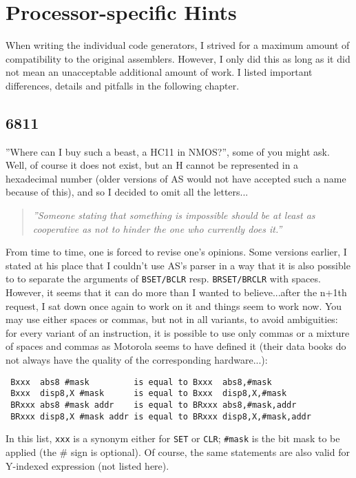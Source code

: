 \documentclass[12pt,twoside]{report}
\newcommand{\tty}[1]{{\tt #1}}
\newcommand{\asname}{{AS}}
\begin{document}

\cleardoublepage
\chapter{Processor-specific Hints}

When writing the individual code generators, I strived for a maximum
amount of compatibility to the original assemblers.  However, I only did this
as long as it did not mean an unacceptable additional amount of work.
I listed important differences, details and pitfalls in the following
chapter.


\section{6811}

''Where can I buy such a beast, a HC11 in NMOS?'', some of you might
ask.  Well, of course it does not exist, but an H cannot be
represented in a hexadecimal number (older versions of \asname{} would not
have accepted such a name because of this), and so I decided to omit
all the letters...
\par
\begin{quote}{\it
''Someone stating that something is impossible should be at least as
 cooperative as not to hinder the one who currently does it.''
}\end{quote}
From time to time, one is forced to revise one's opinions.  Some versions
earlier, I stated at his place that I couldn't use \asname{}'s parser in a way
that it is also possible to to separate the arguments of \tty{BSET/BCLR}
resp. \tty{BRSET/BRCLR} with spaces.  However, it seems that it can do
more than I wanted to believe...after the n+1th request, I sat down once
again to work on it and things seem to work now.  You may use either
spaces or commas, but not in all variants, to avoid ambiguities: for
every variant of an instruction, it is possible to use only commas or a
mixture of spaces and commas as Motorola seems to have defined it (their
data books do not always have the quality of the corresponding
hardware...):
\begin{verbatim}
 Bxxx  abs8 #mask         is equal to Bxxx  abs8,#mask
 Bxxx  disp8,X #mask      is equal to Bxxx  disp8,X,#mask
 BRxxx abs8 #mask addr    is equal to BRxxx abs8,#mask,addr
 BRxxx disp8,X #mask addr is equal to BRxxx disp8,X,#mask,addr
\end{verbatim}
In this list, \tty{xxx} is a synonym either for \tty{SET} or \tty{CLR};
\tty{\#mask} is the bit mask to be applied (the \# sign is optional).  Of
course, the same statements are also valid for Y-indexed expression (not
listed here).
\end{document}
